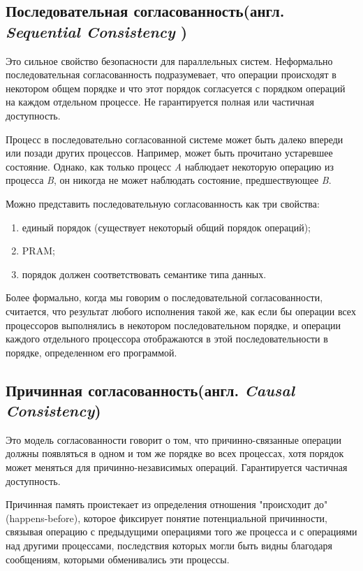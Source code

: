 \documentclass[12pt,  openany]{book}
\begin{document}
\subsection{Последовательная согласованность(англ.  \textit{Sequential Consistency })}
Это сильное свойство безопасности для параллельных систем. Неформально последовательная согласованность подразумевает, что операции происходят в некотором общем порядке и что этот порядок согласуется с порядком операций на каждом отдельном процессе.
Не гарантируется полная или частичная доступность.
\par
Процесс в последовательно согласованной системе может быть далеко впереди или позади других процессов. Например, может быть прочитано устаревшее состояние. Однако, как только процесс \textit{A} наблюдает некоторую операцию из процесса \textit{B}, он никогда не может наблюдать состояние, предшествующее \textit{B}.
\par
Можно представить последовательную согласованность как три свойства: 
\begin{enumerate}
\item единый порядок (существует некоторый общий порядок операций);
\item PRAM;
\item порядок должен соответствовать семантике типа данных.
\end{enumerate}
\par
Более формально, когда мы говорим о последовательной согласованности, считается, что результат любого исполнения такой же, как если бы операции всех процессоров выполнялись в некотором последовательном порядке, и операции каждого отдельного процессора отображаются в этой последовательности в порядке, определенном его программой.

\subsection{Причинная согласованность(англ.  \textit{Causal Consistency})}
Это модель согласованности говорит о том, что причинно-связанные операции должны появляться в одном и том же порядке во всех процессах, хотя порядок может меняться для причинно-независимых операций.
Гарантируется частичная доступность.
\par
Причинная память проистекает из определения отношения "происходит до"(happens-before), которое фиксирует понятие потенциальной причинности, связывая операцию с предыдущими операциями того же процесса и с операциями над другими процессами, последствия которых могли быть видны благодаря сообщениям, которыми обменивались эти процессы.
\end{document}
